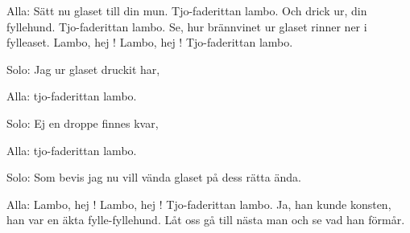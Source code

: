 


	
\beginverse*		%
Alla: Sätt nu glaset till din mun.
      Tjo-faderittan lambo.
      Och drick ur, din fyllehund.
      Tjo-faderittan lambo.
      Se, hur brännvinet ur glaset
      rinner ner i fylleaset.
      Lambo, hej ! Lambo, hej ! Tjo-faderittan lambo.

Solo: Jag ur glaset druckit har,

Alla: tjo-faderittan lambo.

Solo: Ej en droppe finnes kvar,

Alla: tjo-faderittan lambo.

Solo: Som bevis jag nu vill vända
      glaset på dess rätta ända.

Alla: Lambo, hej ! Lambo, hej ! Tjo-faderittan lambo.
      Ja, han kunde konsten, han var en äkta fylle-fyllehund.
      Låt oss gå till nästa man och se vad han förmår.
\endverse			%
\endsong			%
